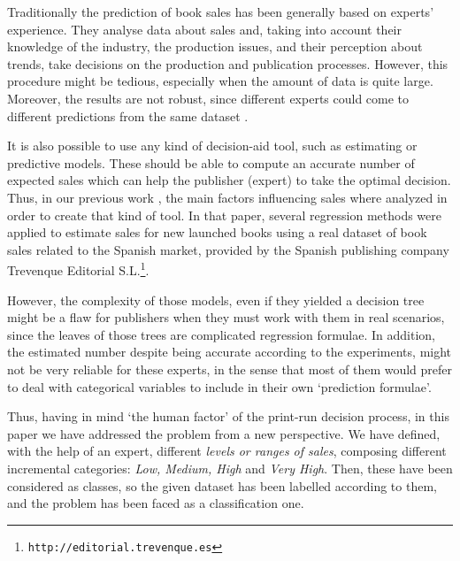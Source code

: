 \documentclass[a4paper,10pt,onecolumn,preprint,3p]{elsarticle}
\begin{document}
Traditionally the prediction of book sales has been generally based on experts' experience. They analyse data about sales and, taking into account their knowledge of the industry, the production issues, and their perception about trends, take decisions on the production and publication processes.
However, this procedure might be tedious, especially when the amount of data is 
quite large. Moreover, the results are not robust, since different experts could come to different predictions from the same dataset \cite{Sanders1994}.

It is also possible to use any kind of decision-aid tool, such as estimating or predictive models. These should be able to compute an accurate number of expected sales which can help the publisher (expert) to take the optimal decision. 
Thus, in our previous work \cite{Castillo2016books}, the main factors influencing sales where analyzed in order to create that kind of tool.
In that paper, several regression methods were applied to estimate sales for new launched books using a real dataset of book sales related to the Spanish market, provided by the Spanish publishing company Trevenque Editorial S.L.\footnote{\tt http://editorial.trevenque.es}.

However, the complexity of those models, even if they yielded a decision tree might be a flaw for publishers when they must work with them in real scenarios, since the leaves of those trees are complicated regression formulae.
In addition, the estimated number despite being accurate according to the experiments, might not be very reliable for these experts, in the sense that most of them would prefer to deal with categorical variables to include in their own `prediction formulae'.

Thus, having in mind `the human factor' of the print-run decision process, in this paper we have addressed the problem from a new perspective. We have defined, with the help of an expert, different \textit{levels or ranges of sales}, composing different incremental categories: \textit{Low, Medium, High} and \textit{Very High}. Then, these have been considered as classes, so the given dataset has been labelled according to them, and the problem has been faced as a classification one.
\end{document}
